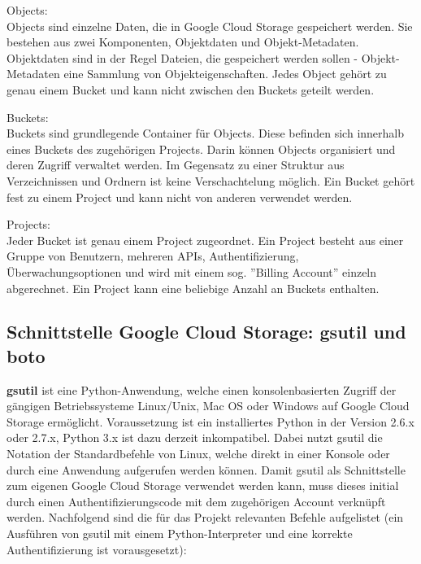 \documentclass[13pt,a4paper,bibliography=totocnumbered,listof=totocnumbered]{scrartcl}
\begin{document}
\begin{compactitem}
	\item Objects:\\
	Objects sind einzelne Daten, die in Google Cloud Storage gespeichert werden. Sie bestehen aus zwei Komponenten, Objektdaten und Objekt-Metadaten. Objektdaten sind in der Regel Dateien, die gespeichert werden sollen - Objekt-Metadaten eine Sammlung von Objekteigenschaften. Jedes Object gehört zu genau einem Bucket und kann nicht zwischen den Buckets geteilt werden. 
		\item Buckets:\\
	Buckets sind grundlegende Container für Objects. Diese befinden sich innerhalb eines Buckets des zugehörigen Projects. Darin können Objects organisiert und deren Zugriff verwaltet werden. Im Gegensatz zu einer Struktur aus Verzeichnissen und Ordnern ist keine Verschachtelung möglich. Ein Bucket gehört fest zu einem Project und kann nicht von anderen verwendet werden.
	\item Projects:\\
 Jeder Bucket ist genau einem Project zugeordnet. Ein Project besteht aus einer Gruppe von Benutzern, mehreren APIs, Authentifizierung, Überwachungsoptionen und wird mit einem sog. ''Billing Account'' einzeln abgerechnet. Ein Project kann eine beliebige Anzahl an Buckets enthalten.
\end{compactitem}

\subsection{Schnittstelle Google Cloud Storage: gsutil und boto}\label{GsutilV}
\textbf{gsutil} \cite{32} ist eine Python-Anwendung, welche einen konsolenbasierten Zugriff der gängigen Betriebssysteme Linux/Unix, Mac OS oder Windows auf Google Cloud Storage ermöglicht. Voraussetzung ist ein installiertes Python in der Version 2.6.x oder 2.7.x,  Python 3.x ist dazu derzeit inkompatibel. Dabei nutzt gsutil die Notation der Standardbefehle von Linux, welche direkt in einer Konsole oder durch eine Anwendung aufgerufen werden können. Damit gsutil als Schnittstelle zum eigenen Google Cloud Storage verwendet werden kann, muss dieses initial durch einen Authentifizierungscode mit dem zugehörigen Account verknüpft werden. Nachfolgend sind die für das Projekt relevanten Befehle aufgelistet (ein Ausführen von gsutil mit einem Python-Interpreter und eine korrekte Authentifizierung ist vorausgesetzt):
\end{document}
